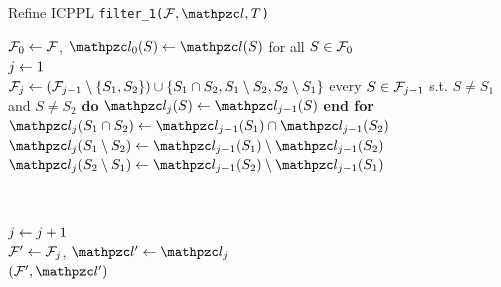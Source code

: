\documentclass[MS]             %
              {iitmdiss_as}    %
\begin{document}
\begin{algorithm}[h]
  \caption{Refine ICPPL {\tt filter\_1($\cF, \cl, T$)}}
  \label{perms}
  \begin{algorithmic}[\lndisplay]
    \STATE ${\cal F}_0 \leftarrow {\cal F}$, $\cl_0(S) \assign \cl(S)$ for all $S \in {\cal F}_0$\\
    \STATE $j \leftarrow 1$\\
    \label{shareleaf} \STATE ${\cal F}_j \leftarrow ({\cal F}_{j-1} \setminus
    \{S_1, S_2\})
    \cup \{S_1 \cap S_2, S_1 \setminus S_2, S_2 \setminus S_1 \}$ \label{setbreak} 
     every $S \in {\cal F}_{j-1}$ s.t. $S \ne S_1$ and $S \ne
    S_2$ {\bf do} $\cl_j(S) \assign \cl_{j-1}(S)$ {\bf end for}\\

    \STATE $\cl_j(S_1 \cap S_2) \assign \cl_{j-1}(S_1) \cap
    \cl_{j-1}(S_2)$
    \STATE $\cl_j(S_1 \setminus S_2) \assign \cl_{j-1}(S_1) \setminus
    \cl_{j-1}(S_2)$ 
    \STATE $\cl_j(S_2 \setminus S_1) \assign \cl_{j-1}(S_2) \setminus
    \cl_{j-1}(S_1)$

    \label{ln:3waycheck}
     \label{ln:exit1} \\
    \ENDIF

    \STATE $j \leftarrow j+1$\\
    \ENDWHILE
    \STATE ${\cal F}' \leftarrow {\cal F}_j$, $\cl' \assign \cl_j$\\
    \RETURN $(\cF', \cl')$
  \end{algorithmic}
\end{algorithm}
\end{document}
